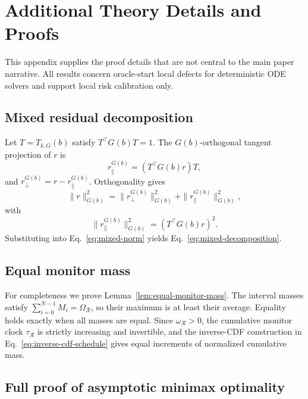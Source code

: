 \section{Additional Theory Details and Proofs}
\label{app:theory-proofs}

This appendix supplies the proof details that are not central to the main
paper narrative. All results concern oracle-start local defects for
deterministic ODE solvers and support local risk calibration only.

\subsection{Mixed residual decomposition}
\label{app:mixed-residual}

Let $T=T_{k,G}(b)$ satisfy $T^\top G(b)T=1$. The $G(b)$-orthogonal tangent
projection of $r$ is
\begin{equation}
  r_\parallel^{G(b)}=(T^\top G(b)r)T,
\end{equation}
and $r_\perp^{G(b)}=r-r_\parallel^{G(b)}$. Orthogonality gives
\begin{equation}
  \|r\|_{G(b)}^2
  =
  \|r_\perp^{G(b)}\|_{G(b)}^2
  +
  \|r_\parallel^{G(b)}\|_{G(b)}^2,
\end{equation}
with
\begin{equation}
  \|r_\parallel^{G(b)}\|_{G(b)}^2=(T^\top G(b)r)^2.
\end{equation}
Substituting into Eq.~\eqref{eq:mixed-norm} yields
Eq.~\eqref{eq:mixed-decomposition}.

\subsection{Equal monitor mass}
\label{app:equal-monitor-mass}

For completeness we prove Lemma~\ref{lem:equal-monitor-mass}. The interval
masses satisfy $\sum_{i=0}^{N-1}M_i=\Omega_{\mathcal R}$, so their maximum is
at least their average. Equality holds exactly when all masses are equal. Since
$\omega_{\mathcal R}>0$, the cumulative monitor clock
$\tau_{\mathcal R}$ is strictly increasing and invertible, and the inverse-CDF
construction in Eq.~\eqref{eq:inverse-cdf-schedule} gives equal increments of
normalized cumulative mass.

\subsection{Full proof of asymptotic minimax optimality}
\label{app:minimax-proof}

